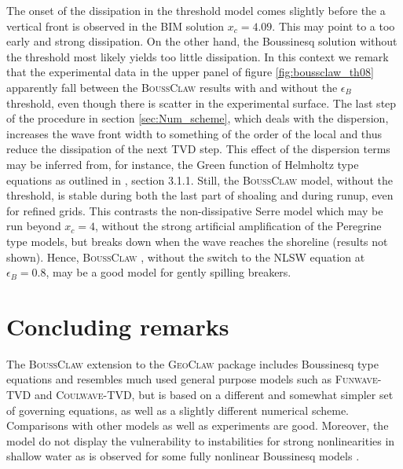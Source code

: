 \documentclass[review]{elsarticle}
\newcommand{\BoussClaw}{\textsc{BoussClaw} }
\begin{document}
The onset of the dissipation in the threshold model comes slightly before the a vertical front is observed in the BIM solution $x_c=4.09$. This may point to a too early and strong dissipation. On the other hand, the Boussinesq solution without the threshold most likely
yields too little dissipation. In this context we remark that the experimental data in
the upper panel of figure \ref{fig:boussclaw_th08} apparently fall between the \BoussClaw results with and 
without the $\epsilon_B$ threshold, even though there is scatter in the experimental 
surface. 
The last step of the procedure in section \ref{sec:Num_scheme}, which
deals with the dispersion, increases the wave front width to something of the order of
the local and thus reduce the dissipation 
of the next TVD step. This effect of the dispersion terms may be inferred from, for instance, the Green function of Helmholtz type equations as outlined in \cite{Glimsdal:2004}, section 3.1.1. Still, the \BoussClaw model, without the threshold, is stable during 
both the last part of shoaling and during runup, even for refined grids. This contrasts
the non-dissipative Serre model which may be run beyond $x_c=4$, without the strong artificial amplification of the Peregrine type models, but breaks down when the wave reaches the shoreline (results not shown). Hence, \BoussClaw, without the switch to the NLSW equation at
$\epsilon_B=0.8$, may be a good model for gently spilling breakers.   

\section{Concluding remarks}
\label{sec:conclusion}
The \BoussClaw extension to the \textsc{GeoClaw} package includes Boussinesq type equations
and resembles much used general purpose models such as \textsc{Funwave-TVD} and
\textsc{Coulwave-TVD}, but is based on a different and somewhat  simpler 
set of governing equations, as well as a slightly different numerical scheme. 
Comparisons with other models as well as experiments are good. Moreover,
the model do not display the vulnerability to instabilities for 
strong nonlinearities in shallow water
as is observed for some fully nonlinear Boussinesq models \citep{Lovholt:2013}. 
\end{document}
